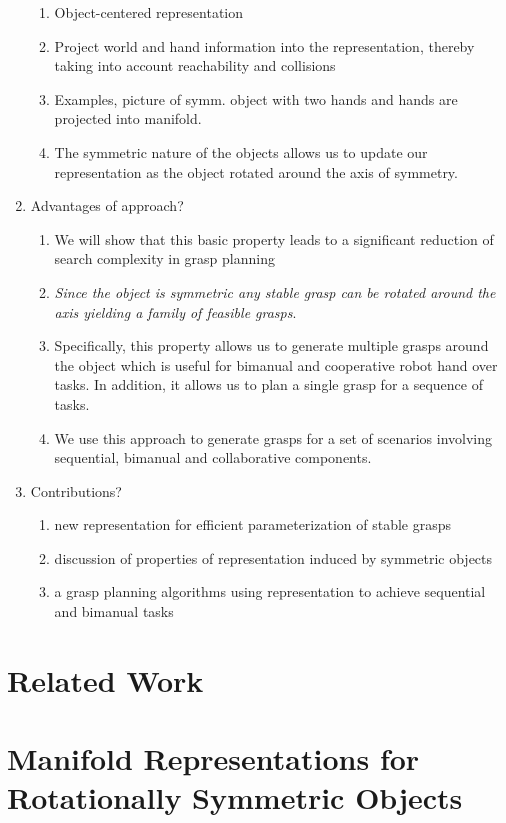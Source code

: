 \documentclass{aamas2015}
\begin{document}
\begin{enumerate}
\begin{enumerate}
	\item Object-centered representation
	\item Project world and hand information into the representation, thereby taking
		  into account reachability and collisions
	\item Examples, picture of symm. object with two hands and hands are projected 
		  into manifold.
	\item The symmetric nature of the objects allows us to update our representation
		  as the object rotated around the axis of symmetry.
\end{enumerate}
\item Advantages of approach?
	\begin{enumerate}
	\item We will show that this basic property leads to a significant reduction of 
		  search complexity in grasp planning
	\item \emph{Since the object is symmetric any stable grasp can be rotated around the axis
		  yielding a family of feasible grasps}.
	\item Specifically, this property allows us to generate multiple grasps around 
		  the object which is useful for bimanual and cooperative robot hand over 
		  tasks. In addition, it allows us to plan a single grasp for a sequence of tasks.
	\item We use this approach to generate grasps for a set of scenarios involving
		  sequential, bimanual and collaborative components. 
	\end{enumerate}
	
\item Contributions?
	\begin{enumerate}
	\item new representation for efficient parameterization of stable grasps 	
	\item discussion of properties of representation induced by symmetric objects
	\item a grasp planning algorithms using representation to achieve sequential and 
		  bimanual tasks  
	\end{enumerate}
	\end{enumerate}
	
\section{Related Work}

\section{Manifold Representations for Rotationally Symmetric Objects}
\end{document}
